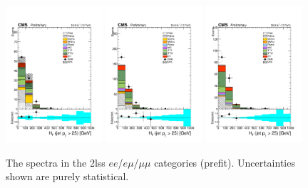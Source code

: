 \begin{figure}[htp]
\centering
\includegraphics[width=0.32\textwidth]{ch5_figs/ht_ttH_ee_stackPlot_SR.pdf}
\includegraphics[width=0.32\textwidth]{ch5_figs/ht_ttH_em_stackPlot_SR.pdf}
\includegraphics[width=0.32\textwidth]{ch5_figs/ht_ttH_mm_stackPlot_SR.pdf} \\
\caption[Data/MC comparison of the \htt spectra in the signal region]{The \htt spectra in the 2lss $ee$/$e\mu$/$\mu\mu$ categories (prefit). Uncertainties shown are purely statistical.}
\label{fig:sr_ht}
\end{figure}

